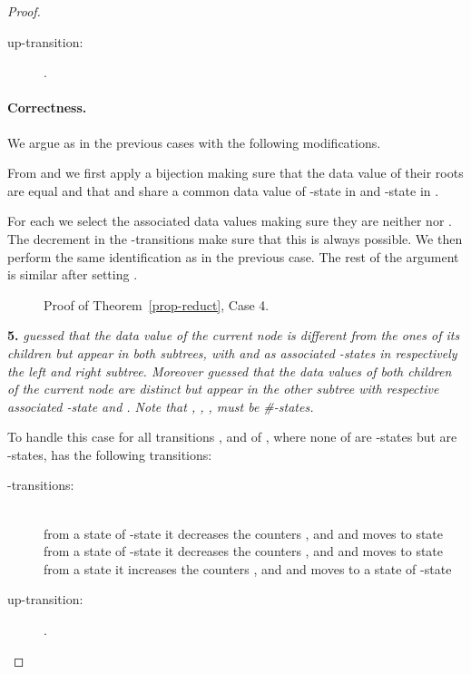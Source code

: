 \documentclass{CSML}
\begin{document}
\begin{proof}
\begin{description}
\item[\rm up-transition:]
.
\end{description}

\paragraph{\bf Correctness.}  
We argue as in the previous cases with the following modifications.

From  and  we first apply a bijection making sure that the
data value  of their roots are equal and that  and  share a common
data value  of -state  in  
and -state  in .

For each  we select the associated data values making sure
they are neither  nor . The decrement in the -transitions make sure
that this is always possible. We then perform the same identification as in the
previous case. 
The rest of the argument is similar after setting .

\begin{figure}
\small

\caption{Proof of Theorem~\ref{prop-reduct}, Case 4.}
\label{fig-reduct4}
\end{figure}






\medskip\noindent\textbf{5.}  \emph{ guessed that the data value  of the
  current node is different from the ones of its children but appear in
  both subtrees, with  and  as associated -states in respectively the left and right subtree.
  Moreover  guessed that the data values of both children of the current node are
  distinct but appear in the other subtree with respective associated -state  and .
  Note that , , ,  must be \#-states.}

To handle this case for all transitions
,
 and 
 of , 
where none of  are -states but
 are -states,  has the following
transitions:
\begin{description}
\item[\rm -transitions:]\quad\\
from a state  of -state 
it decreases the counters ,  and  
and moves to state \\
from a state  of -state  
it decreases the counters ,  and  
and moves to state \\
from a state  
it increases the counters ,  and  
and moves to a state  of -state 

\item[\rm up-transition:]
.
\end{description}


\end{proof}
\end{document}
